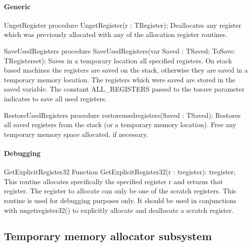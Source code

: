 \documentclass [12pt]{article}
\begin{document}
\paragraph{Generic}

\begin{procedure}{UngetRegister}
\Declaration
procedure UngetRegister(r : TRegister);
\Description
Deallocates any register which was previously allocated with any of the
allocation register routines. 
\end{procedure}

\begin{function}{SaveUsedRegisters}
\Declaration
procedure SaveUsedRegisters(var Saved : TSaved; ToSave: TRegisterset);
\Description 
Saves in a temporary location all specified registers. On stack based
machines the registers are saved on the stack, otherwise they are saved in a
temporary memory location. The registers which were saved are stored in the
\textsf{saved} variable. The constant \textsf{ALL{\_}REGISTERS} passed to
the \textsf{tosave} parameter indicates to save all used registers. 
\end{function}

\begin{function}{RestoreUsedRegisters}
\Declaration
procedure restoreusedregisters(Saved : TSaved);
\Description 
Restores all saved registers from the stack (or a temporary memory
location). Free any temporary memory space allocated, if necessary.
\end{function}

\paragraph{Debugging}

\begin{function}{GetExplicitRegister32}
\Declaration
Function GetExplicitRegister32(r : tregister): tregister;
\Description 
This routine allocates specifically the specified register \textsf{r }and
returns that register. The register to allocate can only be one of the
scratch registers. 
\Notes 
This routine is used for debugging purposes only. It should be used in
conjunctions with ungetregister32() to explicitly allocate and deallocate a
scratch register. 
\end{function}

\subsection{Temporary memory allocator subsystem}
\label{subsec:temporary}
\end{document}
